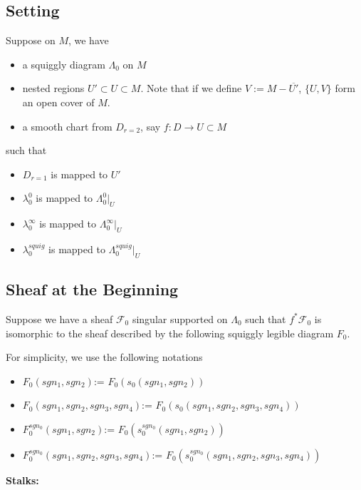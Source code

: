 \subsection{Setting}
Suppose on $M$, we have
\begin{itemize}
\item  a squiggly diagram $\Lambda_0$ on $M$

\item nested regions $U' \subset U \subset M$. Note that if we define $V:= M - \overline{U'}$, $\{U,V\}$ form an open cover of $M$.

\item a smooth chart from $D_{r=2}$, say $f: D  \rightarrow U \subset M$
\end{itemize}
such that 
\begin{itemize}
\item $D_{r=1}$ is mapped to $U'$ 

\item $\lambda_0^0$ is mapped to $\Lambda_0^0 |_{U}$

\item $\lambda_0^\infty$ is mapped to $\Lambda_0^\infty |_{U}$

\item $\lambda_0^{squig}$ is mapped to $\Lambda_0^{squig} |_{U}$
\end{itemize}

\subsection{Sheaf at the Beginning}
Suppose we have a sheaf $\mathscr{F}_0$ singular supported on $\Lambda_0$ such that $f^*\mathscr{F}_0$ is isomorphic to the sheaf described by the following squiggly legible diagram $F_0$.

For simplicity, we use the following notations
\begin{itemize}
\item $F_0(sgn_1,sgn_2)$:= $F_0(s_0(sgn_1,sgn_2))$
\item $F_0(sgn_1,sgn_2,sgn_3,sgn_4)$:= $F_0(s_0(sgn_1,sgn_2,sgn_3,sgn_4))$
\item $F_0^{sgn_0}(sgn_1,sgn_2)$:= $F_0(s_0^{sgn_0}(sgn_1,sgn_2))$
\item $F_0^{sgn_0}(sgn_1,sgn_2,sgn_3,sgn_4)$:= $F_0(s_0^{sgn_0}(sgn_1,sgn_2,sgn_3,sgn_4))$
\end{itemize}
\textbf{Stalks:}

